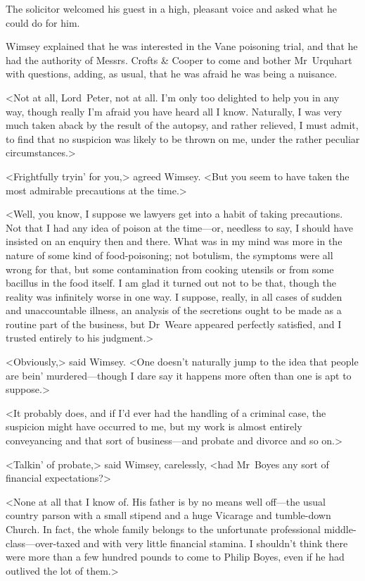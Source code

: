 The solicitor welcomed his guest in a high, pleasant voice and asked what he could do for him.

Wimsey explained that he was interested in the Vane poisoning trial, and that he had the authority of Messrs. Crofts \& Cooper to come and bother Mr~Urquhart with questions, adding, as usual, that he was afraid he was being a nuisance.

<Not at all, Lord~Peter, not at all. I'm only too delighted to help you in any way, though really I'm afraid you have heard all I know. Naturally, I was very much taken aback by the result of the autopsy, and rather relieved, I must admit, to find that no suspicion was likely to be thrown on me, under the rather peculiar circumstances.>

<Frightfully tryin' for you,> agreed Wimsey. <But you seem to have taken the most admirable precautions at the time.>

<Well, you know, I suppose we lawyers get into a habit of taking precautions. Not that I had any idea of poison at the time—or, needless to say, I should have insisted on an enquiry then and there. What was in my mind was more in the nature of some kind of food-poisoning; not botulism, the symptoms were all wrong for that, but some contamination from cooking utensils or from some bacillus in the food itself. I am glad it turned out not to be that, though the reality was infinitely worse in one way. I suppose, really, in all cases of sudden and unaccountable illness, an analysis of the secretions ought to be made as a routine part of the business, but Dr~Weare appeared perfectly satisfied, and I trusted entirely to his judgment.>

<Obviously,> said Wimsey. <One doesn't naturally jump to the idea that people are bein' murdered—though I dare say it happens more often than one is apt to suppose.>

<It probably does, and if I'd ever had the handling of a criminal case, the suspicion might have occurred to me, but my work is almost entirely conveyancing and that sort of business—and probate and divorce and so on.>

<Talkin' of probate,> said Wimsey, carelessly, <had Mr~Boyes any sort of financial expectations?>

<None at all that I know of. His father is by no means well off—the usual country parson with a small stipend and a huge Vicarage and tumble-down Church. In fact, the whole family belongs to the unfortunate professional middle-class—over-taxed and with very little financial stamina. I shouldn't think there were more than a few hundred pounds to come to Philip Boyes, even if he had outlived the lot of them.>

